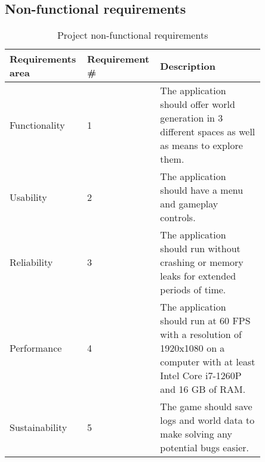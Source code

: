 \subsection{Non-functional requirements}

\begin{table}[H]
    \begin{tabular}{|p{0.25\linewidth}|p{0.2\linewidth}|p{0.4\linewidth}|}
        \hline
        \textbf{Requirements area} & \textbf{Requirement \#} & \textbf{Description}                                                                                                                  \\ \hline
        Functionality              & 1                       & The application should offer world generation in 3 different spaces as well as means to explore them.                                 \\ \hline
        Usability                  & 2                       & The application should have a menu and gameplay controls.                                                                             \\ \hline
        Reliability                & 3                       & The application should run without crashing or memory leaks for extended periods of time.                                             \\ \hline
        Performance                & 4                       & The application should run at 60 FPS with a resolution of 1920x1080 on a computer with at least Intel Core i7-1260P and 16 GB of RAM. \\ \hline
        Sustainability             & 5                       & The game should save logs and world data to make solving any potential bugs easier.                                                   \\ \hline
    \end{tabular}
    \caption{Project non-functional requirements}
\end{table}